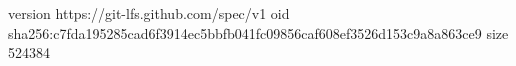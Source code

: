 version https://git-lfs.github.com/spec/v1
oid sha256:c7fda195285cad6f3914ec5bbfb041fc09856caf608ef3526d153c9a8a863ce9
size 524384
